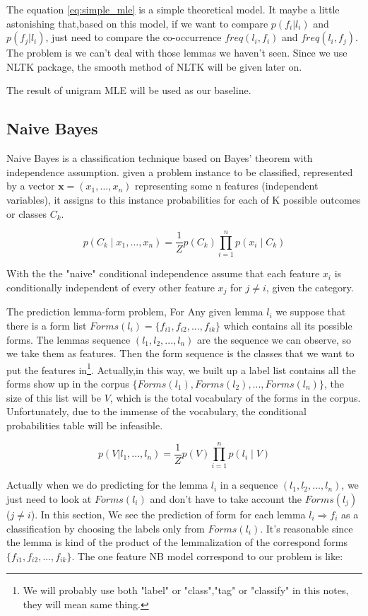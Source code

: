 \documentclass[a4paper]{article}
\begin{document}
The equation \ref{eq:simple_mle} is a simple theoretical model. It maybe a little astonishing that,based on this model, if we want to compare $p(f_i|l_i)$ and $p(f_j|l_i)$, just need to compare the co-occurrence $freq(l_i,f_i)$ and $freq(l_i,f_j)$.  The problem is we can't deal with those lemmas we haven't seen. Since we use NLTK package, the smooth method of NLTK will be given later on. 

The result of unigram MLE will be used as our baseline.

\subsection{Naive Bayes}
Naive Bayes is a classification technique based on Bayes' theorem with independence assumption.  given a problem instance to be classified, represented by a vector ${\mathbf  {x}}=(x_{1},\dots ,x_{n})$ representing some n features (independent variables), it assigns to this instance probabilities for each of K possible outcomes or classes $C_{k}$. \cite{murty_pattern_2011}

\[p(C_{k}\mid x_{1},\dots ,x_{n})={\frac {1}{Z}}p(C_{k})\prod _{i=1}^{n}p(x_{i}\mid C_{k})\]

With the the "naive" conditional independence assume that each feature $x_{i}$ is conditionally independent of every other feature $x_{j}$ for $j \neq i$, given the category. 

The prediction lemma-form problem, For Any given lemma $l_i$ we suppose that there is a form list $Forms(l_i)=\{f_{i1},f_{i2},...,f_{ik}\}$ which contains all its possible forms. The lemmas sequence $(l_1,l_2,...,l_n)$ are the sequence we can observe, so we take them as features. Then the form sequence is the classes that we want to put the features in\footnote{We will probably use both "label" or "class","tag" or "classify" in this notes, they will mean same thing.}. Actually,in this way,  we built up a label list contains all the forms show up in the corpus $\{Forms(l_1),Forms(l_2),..., Forms(l_n)\}$, the size of this list will be $V$, which is the total vocabulary of the forms in the corpus. Unfortunately, due to the immense of the vocabulary, the conditional probabilities table will be infeasible.

\[p(V|l_1,...,l_n) = \frac{1}{Z} p(V) \prod _{i=1}^{n}p(l_i \mid V) \]

Actually when we do predicting for the lemma $l_i$ in a sequence $(l_1,l_2,...,l_n)$, we just need to look at $Forms(l_i)$ and don't have to take account the $Forms(l_j)$ ($j \neq i$). In this section, We see the prediction of form for each lemma $l_i  \Longrightarrow f_i$ as a classification by choosing the labels only from $Forms(l_i)$. It's reasonable since the lemma is kind of the product of the lemmalization of the correspond forms $\{f_{i1},f_{i2},...,f_{ik}\}$. The one feature NB model correspond to our problem is like:
\end{document}
